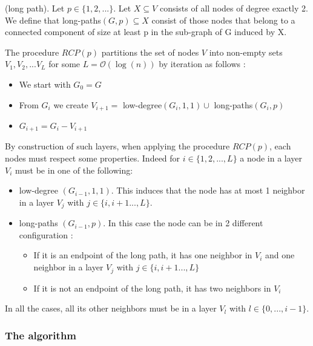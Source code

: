 \begin{defi} (long path).
Let $p \in \{1,2,...\}$. Let $X \subseteq V$ consists of all nodes of degree exactly 2. We define that long-paths$(G, p)\subseteq X$ consist of those nodes that belong to a connected component of size at least p in the sub-graph of G induced by X.
\end{defi}

The procedure $RCP(p)$ partitions the set of nodes $V$ into non-empty sets $V_1,V_2,...V_L$ for some $L = \mathcal{O}(\log(n))$ by iteration as follows \cite[p.23]{1}:
\begin{itemize}
    \item We start with $G_0 = G$
    \item From $G_i$ we create $V_{i+1} = $ low-degree$(G_i,1,1)\cup $ long-paths$(G_i,p)$
    \item $G_{i+1} = G_i- V_{i+1}$
\end{itemize}

By construction of such layers, when applying the procedure $RCP(p)$, each nodes must respect some properties. Indeed for $i \in \{1,2,...,L\}$ a node in a layer $V_i$ must be in one of the following:
\begin{itemize}
    \item low-degree $(G_{i-1},1,1)$.
    This induces that the node has at most 1 neighbor in a layer $V_j$ with $j \in \{i,i+1...,L\}$.
    
    \item long-paths $(G_{i-1},p)$.
    In this case the node can be in 2 different configuration :
    \begin{itemize}
        \item If it is an endpoint of the long path, it has one neighbor in $V_i$ and one neighbor in a layer $V_j$ with $j \in \{i,i+1...,L\}$ 
        \item If it is not an endpoint of the long path, it has two neighbors in $V_i$
    \end{itemize}
\end{itemize}
In all the cases, all its other neighbors must be in a layer $V_l$ with $l \in \{0,...,i-1\}$.

\subsubsection{The algorithm}

